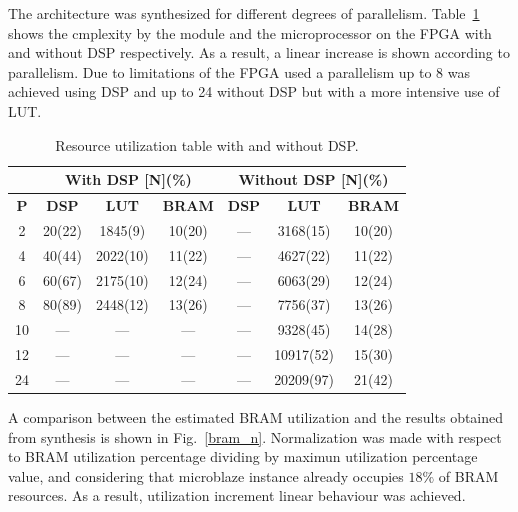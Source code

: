 \documentclass[conference,compsoc]{IEEEtran}
\begin{document}
The architecture was synthesized for different degrees of parallelism.
Table~\ref{res_table} shows the cmplexity by the module and the microprocessor
on the FPGA with and without DSP respectively. As a result, a linear increase is
shown according to parallelism. Due to limitations of the FPGA used a
parallelism up to 8 was achieved using DSP and up to 24 without DSP but with a
more intensive use of LUT.

\begin{table}[!t]
\renewcommand{\arraystretch}{1.3}
\caption{Resource utilization table with and without DSP.}
\label{res_table}
\centering
\begin{tabular}{|c|c|c|c|c|c|c|}
  \hline
  & \multicolumn{3}{c|}{\textbf{With DSP [N](\%)}} & \multicolumn{3}{c|}{\textbf{Without DSP [N](\%)}} \\ \hline
  \textbf{P}  & \textbf{DSP}            & \textbf{LUT}        & \textbf{BRAM}       & \textbf{DSP}         & \textbf{LUT}           & \textbf{BRAM}         \\ \hline
  2  & 20(22)         & 1845(9)    & 10(20)     & ---         & 3168(15)      & 10(20)         \\ \hline
  4  & 40(44)         & 2022(10)   & 11(22)     & ---         & 4627(22)      & 11(22)         \\ \hline
  6  & 60(67)         & 2175(10)   & 12(24)     & ---         & 6063(29)      & 12(24)         \\ \hline
  8  & 80(89)         & 2448(12)   & 13(26)     & ---         & 7756(37)      & 13(26)         \\ \hline
  10 & ---            & ---        & ---        & ---         & 9328(45)      & 14(28)         \\ \hline
  12 & ---            & ---        & ---        & ---         & 10917(52)     & 15(30)         \\ \hline
  24 & ---            & ---        & ---        & ---         & 20209(97)     & 21(42)         \\ \hline
\end{tabular}           
\end{table}

A comparison between the estimated BRAM utilization and the results obtained
from synthesis is shown in Fig.~\ref{bram_n}. Normalization was made with
respect to BRAM utilization percentage dividing by maximun utilization
percentage value, and considering that microblaze instance already occupies $18\%$
of BRAM resources. As a result, utilization increment linear behaviour was
achieved.
\end{document}
